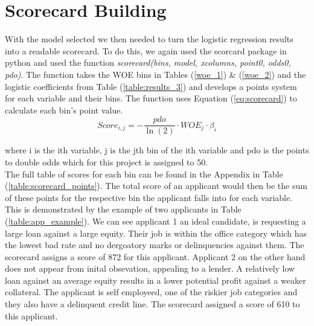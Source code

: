 \section{Scorecard Building}\label{sec:scorecard_building}

With the model selected we then needed to turn the logistic regression results into a readable scorecard. To do this, we again used the scorcard package in python \parencite{statsmodels} and used the function \textit{scorecard(bins, model, xcolumns, point0, odds0, pdo)}. The function takes the WOE bins in Tables (\ref{woe_1}) \& (\ref{woe_2}) and the logistic coefficients from Table (\ref{table:results_3}) and develops a points system for each variable and their bins. The function uses Equation (\ref{eq:scorecard}) to calculate each bin's point value.\\

\begin{equation}\label{eq:scorecard}
Score_{i,j} = -\dfrac{pdo}{\ln(2)} \cdot WOE_{j} \cdot \beta_{i}
\end{equation}

where i is the ith variable, j is the jth bin of the ith variable and pdo is the points to double odds which for this project is assigned to 50. \\

The full table of scores for each bin can be found in the Appendix in Table (\ref{table:scorecard_points}). The total score of an applicant would then be the sum of these points for the respective bin the applicant falls into for each variable. This is demonstrated by the example of two applicants in Table (\ref{table:app_example}). We can see applicant 1 an ideal candidate, is requesting a large loan against a large equity. Their job is within the office category which has the lowest bad rate and no dergoatory marks or delinquencies against them. The scorecard assigns a score of 872 for this applicant. Applicant 2 on the other hand does not appear from inital obsevation, appealing to a lender. A relatively low loan against an average equity results in a lower potential profit against a weaker collateral. The applicant is self employeed, one of the riskier job categories and they also have a delinquent credit line. The scorecard assigned a score of 610 to this applicant. \\ 

